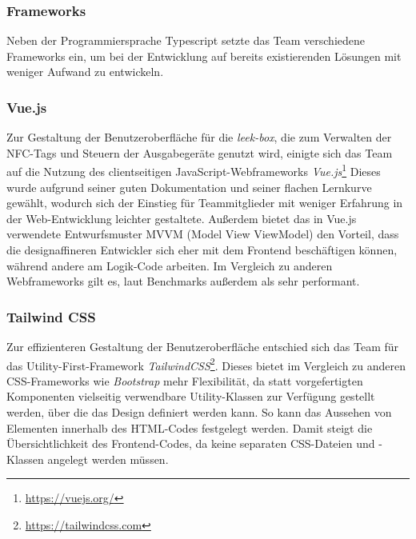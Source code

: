 \documentclass[10pt, a4paper]{article}
\begin{document}
\subsubsection{Frameworks}
Neben der Programmiersprache Typescript setzte das Team verschiedene Frameworks ein, um bei der Entwicklung auf bereits existierenden Lösungen mit weniger Aufwand zu entwickeln.

\subsubsection*{Vue.js}
Zur Gestaltung der Benutzeroberfläche für die \textit{leek-box}, die zum Verwalten der NFC-Tags und Steuern der Ausgabegeräte genutzt wird, einigte sich das Team auf die Nutzung des
clientseitigen JavaScript-Webframeworks \textit{Vue.js}\footnote{\raggedright\url{https://vuejs.org/}}
Dieses wurde aufgrund seiner guten Dokumentation und seiner flachen Lernkurve gewählt, wodurch sich der Einstieg für Teammitglieder mit weniger Erfahrung in der Web-Entwicklung leichter gestaltete.
Außerdem bietet das in Vue.js verwendete Entwurfsmuster MVVM (Model View ViewModel) den Vorteil, dass die designaffineren Entwickler sich eher mit dem Frontend beschäftigen können,
während andere am Logik-Code arbeiten. Im Vergleich zu anderen Webframeworks gilt es, laut Benchmarks außerdem als sehr performant.\cite{Vue_Performance}

\subsubsection*{Tailwind CSS}
Zur effizienteren Gestaltung der Benutzeroberfläche entschied sich das Team für das Utility-First-Framework \textit{TailwindCSS}\footnote{\raggedright\url{https://tailwindcss.com}}.
Dieses bietet im Vergleich zu anderen CSS-Frameworks wie \textit{Bootstrap} mehr Flexibilität, da statt vorgefertigten Komponenten vielseitig verwendbare Utility-Klassen zur Verfügung gestellt werden,
über die das Design definiert werden kann. So kann das Aussehen von Elementen innerhalb des HTML-Codes festgelegt werden.
Damit steigt die Übersichtlichkeit des Frontend-Codes, da keine separaten CSS-Dateien und -Klassen angelegt werden müssen.
\cite{Tailwind_Vorteile}
\end{document}
